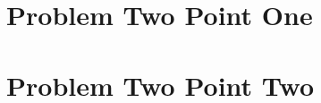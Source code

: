 \documentclass[12pt]{article}
\begin{document}
\section*{Problem Two Point One}
\section*{Problem Two Point Two}
\end{document}
